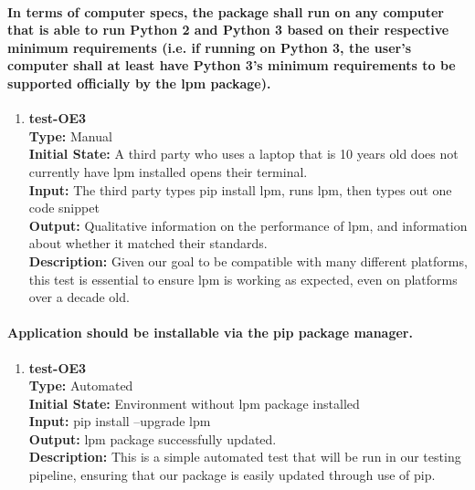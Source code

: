 \documentclass[12pt, titlepage]{article}
\begin{document}
\paragraph{In terms of computer specs, the package shall run on any computer that is
able to run Python 2 and Python 3 based on their respective minimum requirements (i.e.
if running on Python 3, the user’s computer shall at least have Python 3’s minimum
requirements to be supported officially by the lpm package).}
\begin{enumerate}
    \item{\textbf{test-OE3}\\}
    \textbf{Type:} Manual\\
    \textbf{Initial State:} A third party who uses a laptop that is 10 years old does not currently have lpm installed opens their terminal.\\
    \textbf{Input:} The third party types pip install lpm, runs lpm, then types out one code snippet\\
    \textbf{Output:} Qualitative information on the performance of lpm, and information about whether it matched their standards.\\
    \textbf{Description:} Given our goal to be compatible with many different platforms, this test is essential to ensure lpm is working as expected, even on platforms over a decade old.\\
\end{enumerate}

\paragraph{Application should be installable via the pip package manager.}
\begin{enumerate}
    \item{\textbf{test-OE3}\\}
    \textbf{Type:} Automated\\
    \textbf{Initial State:} Environment without lpm package installed\\
    \textbf{Input:} pip install --upgrade lpm\\
    \textbf{Output:} lpm package successfully updated.\\
    \textbf{Description:} This is a simple automated test that will be run in our testing pipeline, ensuring that our package is easily updated through use of pip. \\
\end{enumerate}
\end{document}
